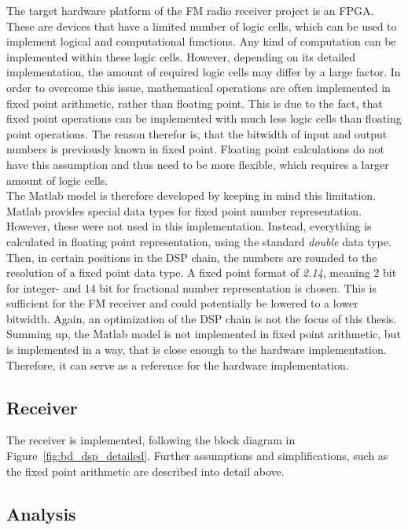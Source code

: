The target hardware platform of the FM radio receiver project is an FPGA.
These are devices that have a limited number of logic cells, which can be used to implement logical and computational functions.
Any kind of computation can be implemented within these logic cells.
However, depending on its detailed implementation, the amount of required logic cells may differ by a large factor.
In order to overcome this issue, mathematical operations are often implemented in fixed point arithmetic, rather than floating point.
This is due to the fact, that fixed point operations can be implemented with much less logic cells than floating point operations.
The reason therefor is, that the bitwidth of input and output numbers is previously known in fixed point.
Floating point calculations do not have this assumption and thus need to be more flexible, which requires a larger amount of logic cells.\\

The Matlab model is therefore developed by keeping in mind this limitation.
Matlab provides special data types for fixed point number representation.
However, these were not used in this implementation.
Instead, everything is calculated in floating point representation, using the standard \textit{double} data type.
Then, in certain positions in the DSP chain, the numbers are rounded to the resolution of a fixed point data type.
A fixed point format of \textit{2.14}, meaning 2 bit for integer- and 14 bit for fractional number representation is chosen.
This is sufficient for the FM receiver and could potentially be lowered to a lower bitwidth.
Again, an optimization of the DSP chain is not the focus of this thesis.\\

Summing up, the Matlab model is not implemented in fixed point arithmetic, but is implemented in a way, that is close enough to the hardware implementation.
Therefore, it can serve as a reference for the hardware implementation.


\subsection{Receiver}

The receiver is implemented, following the block diagram in Figure~\ref{fig:bd_dsp_detailed}.
Further assumptions and simplifications, such as the fixed point arithmetic are described into detail above.

\subsection{Analysis}

